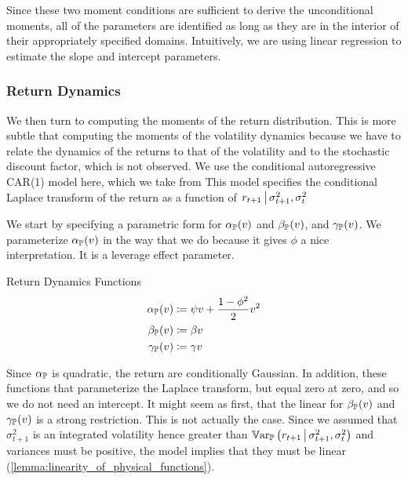 \documentclass[11pt, letterpaper, twoside, final]{article}
\begin{document}
Since these two moment conditions are sufficient to derive the unconditional moments, all of the parameters are
identified as long as they are in the interior of their appropriately specified domains.
Intuitively, we are using linear regression to estimate the slope and intercept parameters.


\subsubsection{Return Dynamics}

We then turn to computing the moments of the return distribution. 
This is more subtle that computing the moments of the volatility dynamics because we have to relate the dynamics
of the returns to that of the volatility and to the stochastic discount factor, which is not observed. 
We use the conditional autoregressive CAR(1) model here, which we take from
\textcite{darolles2006structural,khrapov2016affine}
This model  specifies the conditional Laplace transform of the return as a function of $\left. r_{t+1} \,\middle\vert\,
\sigma^2_{t+1}, \sigma^2_t \right.$

We start by specifying a parametric form for $\alpha_{\mathbb{P}}(v)$ and $\beta_{\mathbb{P}}(v)$, and $\gamma_{\mathbb{P}}(v)$.
We parameterize $\alpha_{\mathbb{P}}(v)$ in the way that we do because it gives $\phi$ a nice interpretation.
It is a leverage effect parameter.

\begin{defn}{Return Dynamics Functions}
    \label{defn:physical_return_dynamics}
    \begin{align}
        \alpha_{\mathbb{P}}(v) &\coloneqq \psi v + \frac{1 - \phi^2}{2} v^2 \\
        \beta_{\mathbb{P}}(v) &\coloneqq \beta v  \\
        \gamma_{\mathbb{P}}(v) &\coloneqq \gamma v  
    \end{align}
\end{defn}

Since $\alpha_{\mathbb{P}}$ is quadratic, the return are conditionally Gaussian.
In addition, these functions that parameterize the Laplace transform, but equal zero at zero, and so we do not
need an intercept.
It might seem as first, that the linear for $\beta_{\mathbb{P}}(v)$ and $\gamma_{\mathbb{P}}(v)$ is a strong restriction.
This is not actually the case.
Since we assumed that $\sigma^2_{t+1}$ is an integrated volatility hence greater than $\operatorname{\mathbb{V}ar}_{\mathbb{P}}\left(r_{t+1} \,\middle\vert\,
\sigma^2_{t+1}, \sigma^2_{t}\right)$ and variances must be positive, the model implies that they must be linear
(\cref{lemma:linearity_of_physical_functions}).
\end{document}
